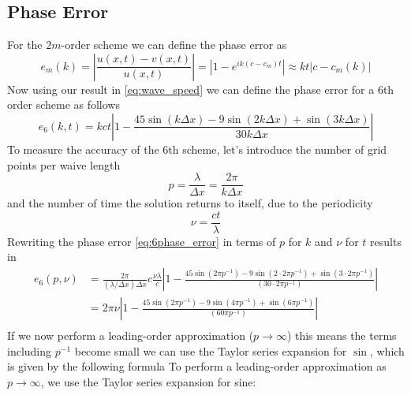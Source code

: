 \subsection*{Phase Error}
For the $2m$-order scheme we can define the phase error as
\begin{equation}
	e_m(k)=\left|\frac{u(x, t)-v(x, t)}{u(x, t)}\right|=\left|1-e^{i k\left(c-c_m\right) t}\right| \approx k t\left|c-c_m(k)\right|
	\label{eq:phase_error}
\end{equation}
Now using our result in \eqref{eq:wave_speed} we can define the phase error for a 6th order scheme as follows
\begin{equation}
	e_6(k, t)=kct\left|1- \frac{45 \sin (k \Delta x) - 9 \sin (2k \Delta x) + \sin (3k \Delta x) }{30 k\Delta x}\right|
	\label{eq:6phase_error}
\end{equation}
To measure the accuracy of the 6th scheme, let's introduce the number of grid points per waive length
\begin{equation}
	p = \frac{\lambda}{\Delta x}= \frac{2 \pi}{k \Delta x}
	\label{eq:n_gp}
\end{equation}
and the number of time the solution returns to itself, due to the periodicity
\begin{equation}
	\nu = \frac{ct}{\lambda}
	\label{eq:periodicity}
\end{equation}
Rewriting the phase error \eqref{eq:6phase_error} in terms of $p$ for $k$ and $\nu$ for $t$ results in
\begin{equation}
	\begin{aligned}
		e_6(p, \nu) & = \frac{2 \pi}{(\lambda/ \Delta x) \Delta x} c \frac{\nu \lambda}{c} \left|1- \frac{45 \sin (2 \pi p^{-1}) - 9 \sin (2 \cdot 2 \pi p^{-1}) + \sin (3 \cdot 2 \pi p^{-1}) }{(30 \cdot 2 \pi p^{-1})}\right| \\
		            & = 2 \pi \nu \left|1- \frac{45 \sin (2 \pi p^{-1}) - 9 \sin (4 \pi p^{-1}) + \sin (6 \pi p^{-1})}{(60 \pi p^{-1})}\right|                                                                                   \\
	\end{aligned}
	\label{eq:6phase_error_pnu}
\end{equation}
If we now perform a leading-order approximation ($p \rightarrow \infty$) this means the terms including $p^{-1}$ become small we can use the Taylor series expansion for $\sin$, which is given by the following formula
To perform a leading-order approximation as $p \to \infty$, we use the Taylor series expansion for sine:
